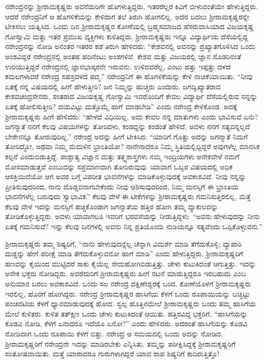 ನರೇಂದ್ರನನ್ನು ಶ‍್ರೀರಾಮಕೃಷ್ಣರು ಅವನೆದುರಿಗೇ ಹೊಗಳುತ್ತಿದ್ದರು, ಇತರರೆಲ್ಲರ ಕಿವಿಗೆ ಬೀಳುವಂತೆಯೇ ಹೇಳುತ್ತಿದ್ದರು. ಆದರೆ ನರೇಂದ್ರನಿಗೆ ಆ ಹೊಗಳಿಕೆಯನ್ನು ಕೇಳಿದಾಗ ತಲೆ ತಿರುಗಿ ಹೋಗಲಿಲ್ಲ. ಅದರ ಬದಲು ಶ‍್ರೀರಾಮಕೃಷ್ಣರನ್ನೇ ಟೀಕಿಸಲು ಯತ್ನಿಸಿದ. ಒಂದು ದಿನ ಶ‍್ರೀರಾಮಕೃಷ್ಣರ ಕೋಣೆಯಲ್ಲಿ ಬ್ರಹ್ಮಸಮಾಜದ ಹೆಸರುವಾಸಿಯಾದ ವಿಜಯಕೃಷ್ಣ ಗೋಸ್ವಾಮಿ ಮತ್ತು ಇತರ ಪ್ರಮುಖ ವ್ಯಕ್ತಿಗಳು ಕುಳಿತಿದ್ದರು. ಶ‍್ರೀರಾಮಕೃಷ್ಣರು ಇನ್ನೂ ವಿದ್ಯಾರ್ಥಿಯ ದೆಸೆಯಲ್ಲಿದ್ದ ನರೇಂದ್ರನನ್ನು ನೋಡಿ ಅನಂತರ ಇತರರ ಕಡೆ ತಿರುಗಿ ಹೇಳಿದರು: “ಕೇಶವನಲ್ಲಿ ಅವನನ್ನು ಪ್ರಖ್ಯಾತಗೊಳಿಸಿದ ಒಂದು ಅಂಶವಿದ್ದರೆ ನರೇಂದ್ರನಲ್ಲಿ ಅಂತಹ ಹದಿನೆಂಟು ಅಂಶಗಳಿವೆ. ಕೇಶವ ಮತ್ತು ವಿಜಯರಲ್ಲಿ ಜ್ಞಾನ ಸೊಡರಿನಂತೆ ಉರಿಯುತ್ತಿದ್ದರೆ ನರೇಂದ್ರನಲ್ಲಿ ಜ್ಞಾನಭಾಸ್ಕರನೇ ಇರುವನು. ಉಳಿದವರೆಲ್ಲ, ಎಂಟು ಹತ್ತು ಇಪ್ಪತ್ತು ದಳದ ಕಮಲಗಳಾದರೆ ನರೇಂದ್ರ ಸಹಸ್ರದಳದ ಪದ್ಮ.” ನರೇಂದ್ರನಿಗೆ ಈ ಹೊಗಳಿಕೆಯನ್ನು ಕೇಳಿ ನಾಚಿಕೆಯಾಯಿತು. “ನೀವು ಏತಕ್ಕೆ ನನ್ನ ವಿಷಯದಲ್ಲಿ ಹೀಗೆ ಹೇಳುತ್ತೀರಿ? ಜನ ನಿಮ್ಮನ್ನು ಹುಚ್ಚರು ಎಂದಾರು. ಜಗದ್ವಿಖ್ಯಾತರಾದ ಕೇಶವಚಂದ್ರಸೇನರು, ಸಂತರಾದ ವಿಜಯಕೃಷ್ಣ ಗೋಸ್ವಾಮಿ ಇವರೊಂದಿಗೆ ಕೇವಲ ವಿದ್ಯಾರ್ಥಿ ದೆಸೆಯಲ್ಲಿರುವ ನನ್ನನ್ನು ಏತಕ್ಕೆ ಹೋಲಿಸುತ್ತೀರಿ? ದಯವಿಟ್ಟು ಮತ್ತೊಮ್ಮೆ ಹಾಗೆ ಮಾಡಬೇಡಿ” ಎಂದು ನರೇಂದ್ರ ಕೇಳಿಕೊಂಡ. ಅದಕ್ಕೆ ಶ‍್ರೀರಾಮಕೃಷ್ಣರು ಹೀಗೆ ಹೇಳಿದರು: “ಹೇಳದೆ ವಿಧಿಯಿಲ್ಲ. ಅದು ಕೇವಲ ನನ್ನ ಮಾತುಗಳು ಎಂದು ಭಾವಿಸುವೆ ಏನು? ಜಗನ್ಮಾತೆ ನನಗೆ ಕೆಲವು ವಿಷಯಗಳನ್ನು ತೋರಿದಳು, ಕಂಡದ್ದನ್ನು ಕಂಡಂತೆ ಹೇಳಿದೆ. ಅವಳು ನನಗೆ ಸತ್ಯವನ್ನಲ್ಲದೆ ಬೇರೇನನ್ನೂ ತೋರುವುದಿಲ್ಲ.” ನರೇಂದ್ರ ಅದನ್ನು ಹೀಗೆ ಟೀಕಿಸಿದ: “ಯಾರಿಗೆ ಗೊತ್ತು ಅದನ್ನು ಜಗನ್ಮಾತೆ ನಿಮಗೆ ತೋರಿದ್ದೋ, ಅಥವಾ ನಿಮ್ಮ ಮೆದುಳಿನ ಭ್ರಾಂತಿಯೋ? ನಾನೇನಾದರೂ ನಿಮ್ಮ ಸ್ಥಿತಿಯಲ್ಲಿದ್ದಿದ್ದರೆ ಅವುಗಳೆಲ್ಲ ಮಾನಸಿಕ ಕಲ್ಪನೆ ಎಂದುಬಿಡುತ್ತಿದ್ದೆ. ಪಾಶ್ಚಾತ್ಯ ವಿಜ್ಞಾನ ಮತ್ತು ತತ್ತ್ವಶಾಸ್ತ್ರಗಳು ನಮ್ಮ ಇಂದ್ರಿಯಗಳು ಅನೇಕವೇಳೆ ನಮಗೆ ಮೋಸಮಾಡುತ್ತವೆ ಎಂಬುದನ್ನು ಸಪ್ರಮಾಣವಾಗಿ ತೋರಿರುವುವು. ಯಾವಾಗ ಒಬ್ಬರ ವಿಷಯದಲ್ಲಿ ಅಧಿಕ ಆಸಕ್ತಿಯಿದೆಯೋ ಆಗ ಅವರ ಬಗ್ಗೆ ವಿಪರೀತ ಭಾವನೆಗಳನ್ನು ಮಾಡಿಕೊಳ್ಳುವುದಕ್ಕೆ ಅವಕಾಶವಿದೆ. ನೀವು ನನ್ನನ್ನು ಪ್ರೀತಿಸುವುದರಿಂದ, ನಾನು ದೊಡ್ಡವನಾಗಬೇಕೆಂದು ನೀವು ಆಶಿಸುವುದರಿಂದ, ನಿಮ್ಮ ಮನಸ್ಸಿಗೆ ಈ ಭ್ರಾಂತಿಯ ಭಾವನೆಗಳೆಲ್ಲ ಬರುವುದು ಸ್ವಾಭಾವಿಕ.” ಕೆಲವು ವೇಳೆ ಈ ಟೀಕೆಗಳನ್ನು ಶ‍್ರೀರಾಮಕೃಷ್ಣರು ಗಮನಿಸುತ್ತಿರಲಿಲ್ಲ. ಮತ್ತೆ ಕೆಲವು ವೇಳೆ ಇದನ್ನು ಮನಸ್ಸಿಗೆ ಹಚ್ಚಿಕೊಂಡಾಗ ಜಗನ್ಮಾತೆಯ ಹತ್ತಿರ ಹೋಗಿ ತಮ್ಮ ವ್ಯಾಕುಲವನ್ನು ತೋಡಿಕೊಳ್ಳುತ್ತಿದ್ದರು. ಅವಳು ಯಾವಾಗಲೂ ಇವರಿಗೆ ಭರವಸೆಯನ್ನು ನೀಡುತ್ತಿದ್ದಳು: “ಅವನು ಹೇಳುವುದನ್ನು ನೀನು ಏತಕ್ಕೆ ಗಮನಿಸುವೆ? ಇನ್ನು ಕೆಲವು ದಿನಗಳಲ್ಲಿ ಅವನು ನಿನ್ನ ಪ್ರತಿಯೊಂದು ನುಡಿಯನ್ನೂ ಸತ್ಯವೆಂದು ಒಪ್ಪಿಕೊಳ್ಳುವನು.”

ಶ‍್ರೀರಾಮಕೃಷ್ಣರು ತಮ್ಮ ಶಿಷ್ಯರಿಗೆ, “ನಾನು ಹೇಳುವುದನ್ನೆಲ್ಲ ಚೆನ್ನಾಗಿ ವಿಮರ್ಶೆ ಮಾಡಿ ತೆಗೆದುಕೊಳ್ಳಿ; ವ್ಯಾಪಾರಿ ದುಡ್ಡನ್ನು ಹೇಗೆ ಪರೀಕ್ಷೆ ಮಾಡಿ ತೆಗೆದುಕೊಳ್ಳುವನೋ ಹಾಗೆ ಮಾಡಿ” ಎಂದು ಹೇಳುತ್ತಿದ್ದರು. ಶ‍್ರೀರಾಮಕೃಷ್ಣರಿಗೆ ಹಣವನ್ನು ಕೈಯಿಂದ ಮುಟ್ಟಿದರೆ ಸಾಕು ಕೈಯೆಲ್ಲ ಸೇದುಹೋಗಿಬಿಡುತ್ತಿತ್ತು. ಚೇಳು ಕುಟುಕಿದಂತೆ ಆಗುತ್ತಿತ್ತು. ಇದನ್ನು ಅನೇಕ ಭಕ್ತರು ನೋಡಿದ್ದರು. ಅವರೆದುರಿಗೆ ಶ‍್ರೀರಾಮಕೃಷ್ಣರು ಹೀಗೆ ನಟನೆ ಮಾಡುತ್ತಿದ್ದರೂ ಇರಬಹುದು ಎಂಬ ಅನುಮಾನ ಬರಲು ಅವಕಾಶವಿದೆ. ಒಂದು ಸಲ ನರೇಂದ್ರ ದಕ್ಷಿಣೇಶ್ವರಕ್ಕೆ ಬಂದ. ಕೋಣೆಯೊಳಗೆ ಶ‍್ರೀರಾಮಕೃಷ್ಣರು ಇರಲಿಲ್ಲ, ಹೊರಗೆ ಹೋಗಿದ್ದರು. ನರೇಂದ್ರ ಶ‍್ರೀರಾಮಕೃಷ್ಣರ ಹಾಸಿಗೆಯ ಕೆಳಗೆ ಒಂದು ರೂಪಾಯಿಯನ್ನು ಬಚ್ಚಿಟ್ಟು ಪಂಚವಟಿಯ ಕೆಳಗೆ ಧ್ಯಾನಮಾಡುವುದಕ್ಕೆ ಹೋದ. ಸ್ವಲ್ಪ ಹೊತ್ತಿನಮೇಲೆ ಶ‍್ರೀರಾಮಕೃಷ್ಣರು ಬಂದು ತಮ್ಮ ಹಾಸಿಗೆಯ ಮೇಲೆ ಕುಳಿತರು. ಕುಳಿತ ತತ್‍ಕ್ಷಣ ಒಂದು ಚೇಳು ಕುಟುಕಿದಂತೆ ಆಯಿತು. ಹತ್ತಿರವಿದ್ದ ಭಕ್ತರಿಗೆ, “ಹಾಸಿಗೆಯನ್ನು ಕೊಡವಿ ನೋಡಿ, ಕೆಳಗೆ ಏನಾದರೂ ಇದೆಯೊ ಏನೋ?” ಎಂದು ಹೇಳಿದರು. ಅದರಂತೆ ಹಾಸಿಗೆಯನ್ನು ಕೊಡವಿ ನೋಡಿದಾಗ ಒಂದು ರೂಪಾಯಿ ಕೆಳಗೆ ಬಿತ್ತು. ನರೇಂದ್ರ ಆ ಸಮಯದಲ್ಲಿ ಬಂದು ಅದನ್ನು ನೋಡಿದ. ಶ‍್ರೀರಾಮಕೃಷ್ಣರಿಗೆ ನರೇಂದ್ರನೇ ಇದನ್ನು ಮಾಡಿರಬೇಕು ಎನ್ನಿಸಿತು. ತಮ್ಮನ್ನು ಪರೀಕ್ಷಿಸಿದ್ದಕ್ಕೆ ಶ‍್ರೀರಾಮಕೃಷ್ಣರಿಗೆ ಸಂತೋಷವಾಯಿತು. ಮತ್ತೆ ಯಾರಾದರೂ ಗುರುಗಳಾಗಿದ್ದರೆ ಯಾವ ಶಾಪ ಶಿಷ್ಯನಿಗೆ ಕಾದಿರುತ್ತಿತ್ತೊ!

